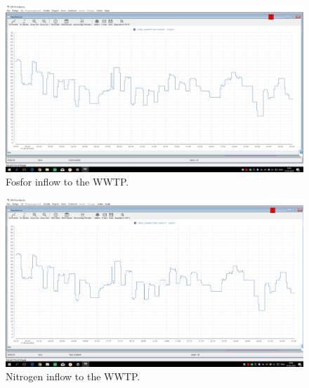\begin{figure}[H]
	\centering
	\includegraphics[width=0.95\textheight, angle=-90]{report/appendix/figures/Forfos_data.png}
	\caption{Fosfor inflow to the WWTP.}
	\label{fig:Forfos_data}
\end{figure}

\begin{figure}[H]
	\centering
	\includegraphics[width=0.95\textheight, angle=-90]{report/appendix/figures/kvaelstof_data.png}
	\caption{Nitrogen inflow to the WWTP.}
	\label{fig:kvaelstof_data}
\end{figure}